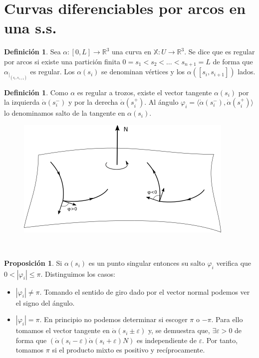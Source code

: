 \documentclass[twoside]{report}
\theoremstyle{definition}
\newtheorem{defi}[theorem]{Definición}
\newtheorem{prop}[theorem]{Proposición}
\numberwithin{equation}{section}
\newcommand{\R}{\mathbb{R}}
\newcommand{\X}{\mathbb{X}}
\begin{document}
\section{Curvas diferenciables por arcos en una s.s.}
\begin{defi} 
Sea $\alpha:[0,L] \rightarrow \R^3$ una curva en $\X:U\rightarrow \R^3$. Se dice que es regular por arcos si existe una partición finita $0=s_1 < s_2 < \dotsc < s_{n+1} = L$ de forma que $\alpha_{|_{(s_i,s_{i+1})}}$ es regular. Los $\alpha(s_i)$ se denominan vértices y los $\alpha([s_i,s_{i+1}])$ lados.
\end{defi}
\begin{defi}
Como $\alpha$ es regular a trozos, existe el vector tangente $\alpha(s_i)$ por la izquierda $\dot{\alpha}(s_i^-)$ y por la derecha $\dot{\alpha}(s_i^+)$. Al ángulo $\varphi_i = \langle \dot{\alpha}(s_i^-),\dot{\alpha}(s_i^+)\rangle$ lo denominamos salto de la tangente en $\alpha(s_i)$.

\begin{figure}[h!]
	\centering
	\includegraphics[scale=0.4]{normal}
\end{figure}\

\end{defi}
\begin{prop}
Si $\alpha(s_i)$ es un punto singular entonces su salto $\varphi_i$ verifica que $0<|\varphi_i|\leq \pi$. Distinguimos los casos:
\begin{itemize}
\item $|\varphi_i|\neq \pi$. Tomando el sentido de giro dado por el vector normal podemos ver el signo del ángulo.
\item $|\varphi_i| = \pi$. En principio no podemos determinar si escoger $\pi$ o $-\pi$. Para ello tomamos el vector tangente en $\dot{\alpha}(s_i\pm\varepsilon)$ y, se demuestra que, $\exists \varepsilon >0$ de forma que $(\dot{\alpha}(s_i -\varepsilon) \dot{\alpha}(s_i+\varepsilon) N)$ es independiente de $\varepsilon$. Por tanto, tomamos $\pi$ si el producto mixto es positivo y recíprocamente.
\end{itemize}
\end{prop}
\end{document}
